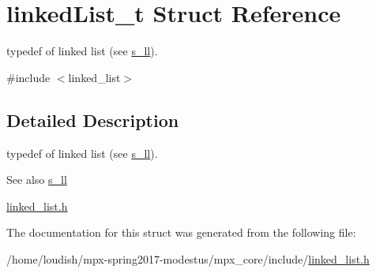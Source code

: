 \hypertarget{structlinked_list__t}{}\section{linked\+List\+\_\+t Struct Reference}
\label{structlinked_list__t}


typedef of linked list (see \hyperlink{structs__ll}{s\+\_\+ll}).  




{\ttfamily \#include $<$linked\+\_\+list$>$}



\subsection{Detailed Description}
typedef of linked list (see \hyperlink{structs__ll}{s\+\_\+ll}). 

\begin{DoxySeeAlso}{See also}
\hyperlink{structs__ll}{s\+\_\+ll} 

\hyperlink{linked__list_8h}{linked\+\_\+list.\+h} 
\end{DoxySeeAlso}


The documentation for this struct was generated from the following file\+:\begin{DoxyCompactItemize}
\item 
/home/loudish/mpx-\/spring2017-\/modestus/mpx\+\_\+core/include/\hyperlink{linked__list_8h}{linked\+\_\+list.\+h}\end{DoxyCompactItemize}
